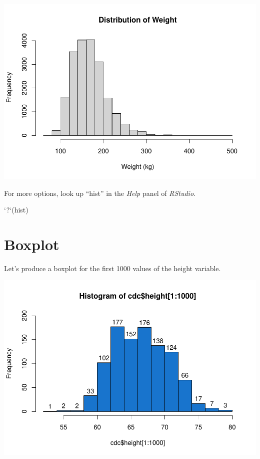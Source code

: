 \documentclass[
]{book}
\newenvironment{Shaded}{\begin{snugshade}}{\end{snugshade}}
\newcommand{\DataTypeTok}[1]{\textcolor[rgb]{0.13,0.29,0.53}{#1}}
\newcommand{\DecValTok}[1]{\textcolor[rgb]{0.00,0.00,0.81}{#1}}
\newcommand{\KeywordTok}[1]{\textcolor[rgb]{0.13,0.29,0.53}{\textbf{#1}}}
\newcommand{\NormalTok}[1]{#1}
\newcommand{\OperatorTok}[1]{\textcolor[rgb]{0.81,0.36,0.00}{\textbf{#1}}}
\newcommand{\StringTok}[1]{\textcolor[rgb]{0.31,0.60,0.02}{#1}}
\begin{document}
\includegraphics{_main_files/figure-latex/unnamed-chunk-172-1.pdf}

For more options, look up ``hist'' in the \emph{Help} panel of \emph{RStudio}.

\begin{Shaded}
\begin{Highlighting}[]
\StringTok{`}\DataTypeTok{?}\StringTok{`}\NormalTok{(hist)}
\end{Highlighting}
\end{Shaded}

\hypertarget{boxplot}{%
\section{Boxplot}\label{boxplot}}

Let's produce a boxplot for the first 1000 values of the height variable.

\begin{Shaded}
\end{Shaded}

\includegraphics{_main_files/figure-latex/unnamed-chunk-174-1.pdf}
\end{document}
